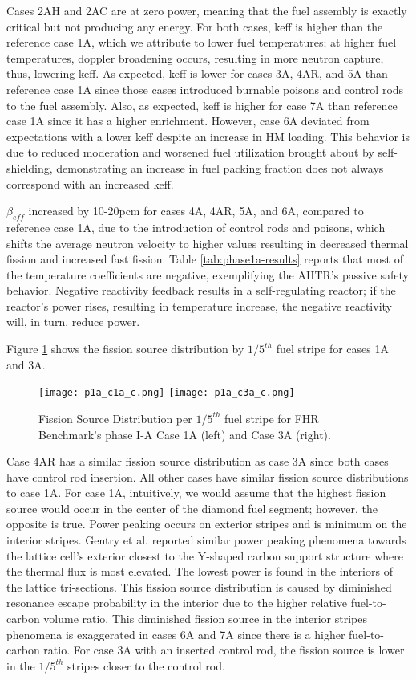 Cases 2AH and 2AC are at zero power, meaning that the fuel assembly is exactly 
critical but not producing any energy. 
For both cases, keff is higher than the reference case 1A, which we attribute to 
lower fuel temperatures; at higher fuel temperatures, doppler broadening occurs, 
resulting in more neutron capture, thus, lowering keff. 
As expected, keff is lower for cases 3A, 4AR, and 5A than reference case 
1A since those cases introduced burnable poisons and control rods to the fuel 
assembly. 
Also, as expected, keff is higher for case 7A than reference case 1A since 
it has a higher enrichment. 
However, case 6A deviated from expectations with a lower keff despite an increase 
in \gls{HM} loading. 
This behavior is due to reduced moderation and worsened fuel 
utilization brought about by self-shielding, demonstrating an increase in 
fuel packing fraction does not always correspond with an increased keff. 

$\beta_{eff}$ increased by 10-20pcm for cases 4A, 4AR, 5A, and 6A, compared to
reference case 1A, due to the introduction of control rods and poisons, which 
shifts the average neutron velocity to higher values resulting in decreased
thermal fission and increased fast fission\cite{torabi_neutronic_2018}.
Table \ref{tab:phase1a-results} reports that most of the temperature coefficients 
are negative, exemplifying the \gls{AHTR}'s passive safety behavior. 
Negative reactivity feedback results in a self-regulating reactor; if the reactor's 
power rises, resulting in temperature increase, the negative reactivity will, 
in turn, reduce power. 

Figure \ref{fig:phase1a-c} shows the fission source distribution by 
$1/5^{th}$ fuel stripe for cases 1A and 3A. 
\begin{figure}[]
    \centering
    \texttt{[image: p1a\_c1a\_c.png]} 
    \texttt{[image: p1a\_c3a\_c.png]} 
    \caption{Fission Source Distribution per $1/5^{th}$ fuel stripe for \gls{FHR} 
    Benchmark's phase I-A Case 1A (left) and Case 3A (right).}
    \label{fig:phase1a-c}
\end{figure}
Case 4AR has a similar fission source distribution as case 3A since both 
cases have control rod insertion. 
All other cases have similar fission source distributions to case 1A. 
For case 1A, intuitively, we would assume that the highest fission source would 
occur in the center of the diamond fuel segment; however, the opposite is true. 
Power peaking occurs on exterior stripes and is minimum on the interior stripes.
Gentry et al. \cite{gentry_development_2016} reported similar power peaking 
phenomena towards the lattice cell's exterior closest to the Y-shaped carbon 
support structure where the thermal flux is most elevated. 
The lowest power is found in the interiors of the lattice tri-sections. 
This fission source distribution is caused by diminished resonance escape 
probability in the interior due to the higher relative fuel-to-carbon volume 
ratio. 
This diminished fission source in the interior stripes phenomena is exaggerated 
in cases 6A and 7A since there is a higher fuel-to-carbon ratio.
For case 3A with an inserted control rod, the fission source is lower in 
the $1/5^{th}$ stripes closer to the control rod.  

